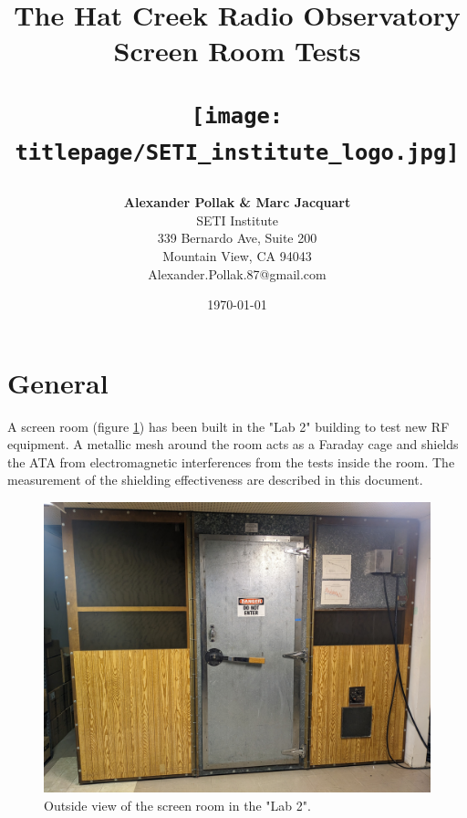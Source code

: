 \documentclass[12pt,a4paper,oneside]{article}
\title{\Huge The Hat Creek Radio Observatory\\
\vspace{0.5cm}
Screen Room Tests\\
\vspace{0.5cm}
\normalsize \emph{}
\vspace{3.5cm}
\begin{center}
\texttt{[image: titlepage/SETI\_institute\_logo.jpg]}
\end{center}
}
\author{ 
\vspace{1cm}
\Large
\textbf{ Alexander Pollak \& Marc Jacquart} \\
SETI Institute \\ 
339 Bernardo Ave, Suite 200 \\
Mountain View, CA 94043 \\ 
Alexander.Pollak.87@gmail.com\\
}
\date{\today}
\begin{document}
\clearpage\maketitle
\thispagestyle{empty}

%



%

\newpage

\section{General}
\label{sec:General}
A screen room (figure \ref{fig:screen_room_outside}) has been built in the "Lab 2" building to test new RF equipment. A metallic mesh around the room acts as a Faraday cage and shields the ATA from electromagnetic interferences from the tests inside the room. The measurement of the shielding effectiveness are described in this document.


\begin{figure}[H]
\centering
\includegraphics[width=1\linewidth]{images/screen_room.jpg}
\caption{Outside view of the screen room in the "Lab 2".}
\label{fig:screen_room_outside}
\end{figure}
\end{document}
